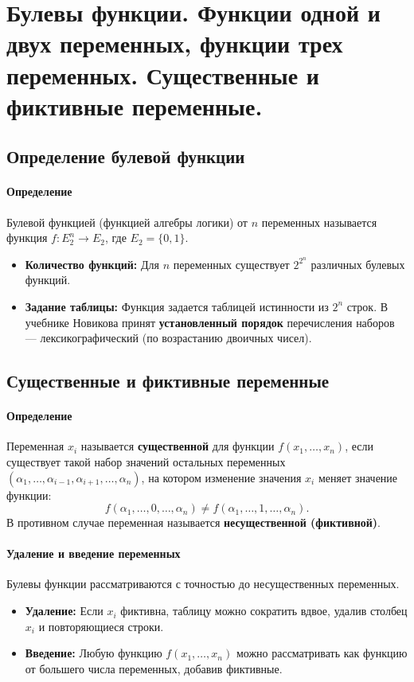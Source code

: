 \section{Булевы функции. Функции одной и двух переменных, функции трех переменных. Существенные и фиктивные переменные.}

\subsection*{Определение булевой функции}

\paragraph{Определение}
Булевой функцией (функцией алгебры логики) от $n$ переменных называется функция $f: E_2^n \to E_2$, где $E_2 = \{0, 1\}$.
\begin{itemize}
    \item \textbf{Количество функций:} Для $n$ переменных существует $2^{2^n}$ различных булевых функций.
    \item \textbf{Задание таблицы:} Функция задается таблицей истинности из $2^n$ строк. В учебнике Новикова принят \textbf{установленный порядок} перечисления наборов — лексикографический (по возрастанию двоичных чисел).
\end{itemize}

\subsection*{Существенные и фиктивные переменные}

\paragraph{Определение}
Переменная $x_i$ называется \textbf{существенной} для функции $f(x_1, \dots, x_n)$, если существует такой набор значений остальных переменных $(\alpha_1, \dots, \alpha_{i-1}, \alpha_{i+1}, \dots, \alpha_n)$, на котором изменение значения $x_i$ меняет значение функции:
$$f(\alpha_1, \dots, 0, \dots, \alpha_n) \neq f(\alpha_1, \dots, 1, \dots, \alpha_n).$$
В противном случае переменная называется \textbf{несущественной (фиктивной)}.

\paragraph{Удаление и введение переменных}
Булевы функции рассматриваются с точностью до несущественных переменных.
\begin{itemize}
    \item \textbf{Удаление:} Если $x_i$ фиктивна, таблицу можно сократить вдвое, удалив столбец $x_i$ и повторяющиеся строки.
    \item \textbf{Введение:} Любую функцию $f(x_1, \dots, x_n)$ можно рассматривать как функцию от большего числа переменных, добавив фиктивные.
\end{itemize}


